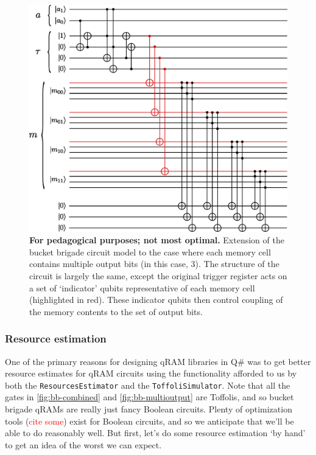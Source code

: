 \documentclass[a4paper,12pt]{article}
\begin{document}
\begin{figure}
 \centering
 \captionsetup{width=.89\linewidth}
 \includegraphics[scale=0.8]{images/bb-2qubit-3bitout}
 \caption{\textbf{For pedagogical purposes; not most optimal.} Extension of the bucket brigade circuit model to the case where each memory cell contains multiple output bits (in this case, 3). The structure of the circuit is largely the same, except the original trigger register acts on a set of `indicator' qubits representative of each memory cell (highlighted in red). These indicator qubits then control coupling of the memory contents to the set of output bits.}
 \label{fig:bb-multioutput}
\end{figure}


\subsubsection{Resource estimation}

One of the primary reasons for designing qRAM libraries in Q\# was to get better resource estimates for qRAM circuits using the functionality afforded to us by both the \texttt{ResourcesEstimator} and the \texttt{ToffoliSimulator}. Note that all the gates in \autoref{fig:bb-combined} and \autoref{fig:bb-multioutput} are Toffolis, and so bucket brigade qRAMs are really just fancy Boolean circuits. Plenty of optimization tools (\textcolor{red}{cite some}) exist for Boolean circuits, and so we anticipate that we'll be able to do reasonably well. But first, let's do some resource estimation `by hand' to get an idea of the worst we can expect.
\end{document}
